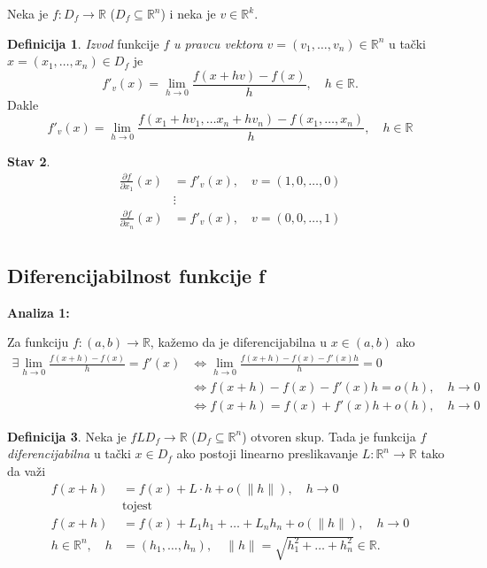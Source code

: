 \documentclass[11pt]{article}
\theoremstyle{definition}
\newtheorem{definicija}{Definicija}[section]
\newtheorem{stav}[definicija]{Stav}
\theoremstyle{serbnodot}
\begin{document}
Neka je \(f: D_f \to \mathbb{R}\) (\(D_f \subseteq \mathbb{R}^n\)) 
i neka je \(v \in \mathbb{R}^k\).


\begin{definicija}
    \textit{Izvod} funkcije \(f\) \textit{u pravcu vektora} \(v = (v_1, \dots, v_n)\in \mathbb{R}^n\)
    u tački \(x = (x_1, \dots, x_n) \in D_f\) je 
    \[
        f'_v(x) = \lim_{h \to 0} \frac{f(x+hv) - f(x)}{h}, \quad h\in \mathbb{R}.
    \]
    Dakle
    \[
        f'_v(x) = \lim_{h \to 0} \frac{f(x_1 + hv_1, \dots x_n + hv_n) 
        - f(x_1, \dots , x_n)}{h}, \quad h\in \mathbb{R}
    \]
\end{definicija}



\begin{stav}
    \begin{align*}
        \frac{\partial f}{\partial x_1} (x) &= f'_v(x), \quad v = (1, 0, \dots , 0) \\
        &\vdots \\
        \frac{\partial f}{\partial x_n} (x) &= f'_v(x), \quad v = (0, 0, \dots , 1) \\
    \end{align*}
\end{stav}


\subsection{Diferencijabilnost funkcije f}


\textbf{Analiza 1:}

Za funkciju \(f: (a, b) \to \mathbb{R}\), kažemo da je diferencijabilna u 
\(x \in (a, b) \) ako 
\begin{align*}
    \exists \lim_{h \to 0} \frac{f(x + h) - f(x)}{h} = f'(x) &\iff \lim_{h \to 0}
    \frac{f(x+h) - f(x) - f'(x) h}{h} = 0 \\
    &\iff f(x+h) - f(x) - f'(x)h = o(h), \quad h \to 0 \\
    &\iff f(x+h) = f(x) + f'(x)h + o(h), \quad h \to 0
\end{align*}

\begin{definicija}
    Neka je \(fL D_f \to \mathbb{R}\) (\(D_f \subseteq \mathbb{R}^n\)) otvoren skup.
    Tada je funkcija \(f\) \textit{diferencijabilna} u tački \(x \in D_f\) ako postoji
    linearno preslikavanje \(L: \mathbb{R}^n \to \mathbb{R}\) tako da važi
    \begin{align*}
        f(x+h) &= f(x) + L\cdot h + o(\lVert h \rVert), \quad h \to 0 \\
        &\text{tojest} \\
        f(x+h) &= f(x) + L_1h_1 + \dots + L_nh_n + o(\lVert h \rVert), \quad h \to 0 \\
        h \in \mathbb{R}^n, \quad h &= (h_1, \dots, h_n), \quad \lVert h \rVert = \sqrt{h^{2}_1 + \dots + h^{2}_n} \in \mathbb{R}.
    \end{align*}
\end{definicija}
\end{document}
